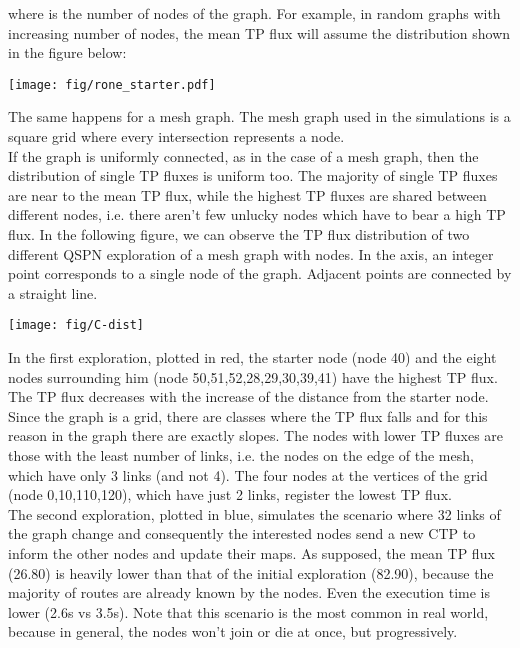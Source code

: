 \documentclass[a4paper]{article}
\begin{document}
where  is the number of nodes of the graph.
For example, in random graphs with increasing number of nodes, the mean TP
flux will assume the distribution shown in the figure below:
\begin{center}
\label{fig:rone_starter}
\texttt{[image: fig/rone\_starter.pdf]}
\end{center}
The same happens for a mesh graph. The mesh graph used in the simulations
is a square grid where every intersection represents a node.\\
If the graph is uniformly connected, as in the case of a mesh graph, then the
distribution of single TP fluxes is uniform too.
The majority of single TP fluxes are near to the mean TP
flux, while the highest TP fluxes are shared between different nodes, i.e.
there aren't few unlucky nodes which have to bear a high TP flux.
In the following figure, we can observe the TP flux distribution
of two different QSPN exploration of a mesh graph with  nodes.
In the  axis, an integer point corresponds to a single node of the graph.
Adjacent points are connected by a straight line.\\
\begin{center}
\label{fig:C-dist}
\texttt{[image: fig/C-dist]}
\end{center}
In the first exploration, plotted in red, the starter node (node 40) and the eight nodes
surrounding him (node 50,51,52,28,29,30,39,41) have the highest TP flux. The TP flux decreases with the
increase of the distance from the starter node. Since the graph is a
 grid, there are  classes where the TP flux falls and for this
reason in the graph there are exactly  slopes. The nodes with lower TP fluxes are
those with the least number of links, i.e. the nodes on the edge of the mesh,
which have only 3 links (and not 4). The four nodes at the vertices of the
grid (node 0,10,110,120), which have just 2
links, register the lowest TP flux.\\
The second exploration, plotted in blue, simulates the scenario where 32 links of the graph
change and consequently the interested nodes send a new CTP to inform the
other nodes and update their maps. As supposed, the mean TP flux (26.80) is heavily
lower than that of the initial exploration (82.90), because the majority of
routes are already known by the nodes. Even the execution time is lower (2.6s
vs 3.5s). Note that this scenario is the most common in real world, because
in general, the nodes won't join or die at once, but progressively.
\end{document}
